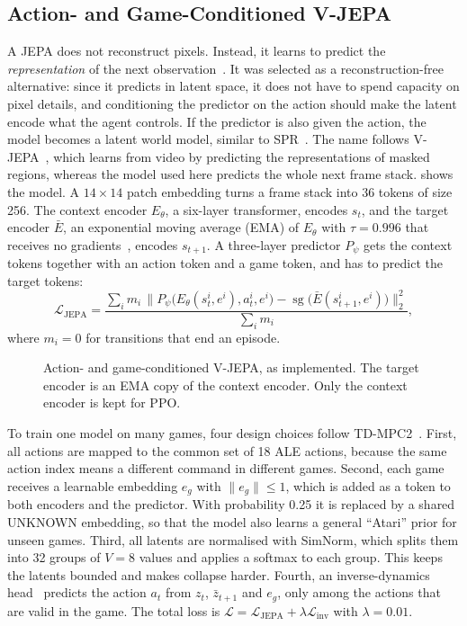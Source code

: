 \documentclass[runningheads,a4paper]{llncs}
\begin{document}
\subsection{Action- and Game-Conditioned V-JEPA}
\label{sec:jepa-model}

A JEPA does not reconstruct pixels. Instead, it learns to predict the \emph{representation}
of the next observation~\cite{lecun2022path}. It was selected as a reconstruction-free
alternative: since it predicts in latent space, it does not have to spend capacity on pixel
details, and conditioning the predictor on the action should make the latent encode what the
agent controls. If the predictor is also given the action, the
model becomes a latent world model, similar to SPR~\cite{schwarzer2021spr}. The name follows
V-JEPA~\cite{bardes2024vjepa}, which learns from video by predicting the representations of
masked regions, whereas the model used here predicts the whole next frame stack. 
shows the model. A $14\times14$ patch embedding turns a frame stack into 36 tokens of
size 256. The context encoder $E_\theta$, a six-layer transformer, encodes $s_t$, and the
target encoder $\bar E$, an exponential moving average (EMA) of $E_\theta$ with $\tau=0.996$
that receives no gradients~\cite{assran2023ijepa}, encodes $s_{t+1}$. A three-layer predictor
$P_\psi$ gets the context tokens together with an action token and a game token, and has to
predict the target tokens:
\begin{equation}
  \mathcal{L}_{\text{JEPA}}=\frac{\sum_i m_i\,\big\|P_\psi\big(E_\theta(s_t^i,e^i),a_t^i,e^i\big)
  -\operatorname{sg}\big(\bar E(s_{t+1}^i,e^i)\big)\big\|_2^2}{\sum_i m_i},
\end{equation}
where $m_i=0$ for transitions that end an episode.

\begin{figure}[tb]
\centering

\caption{Action- and game-conditioned V-JEPA, as implemented. The target
encoder is an EMA copy of the context encoder. Only the context encoder is kept for PPO.}
\label{fig:jepa}
\end{figure}

To train one model on many games, four design choices follow
TD-MPC2~\cite{hansen2024tdmpc2}. First, all actions are mapped to the common set of 18 ALE
actions, because the same action index means a different command in different games. Second, each game
receives a learnable embedding $e_g$ with $\|e_g\|\le1$, which is added as a token to both
encoders and the predictor. With probability 0.25 it is replaced by a shared UNKNOWN
embedding, so that the model also learns a general ``Atari'' prior for unseen games. Third, all
latents are normalised with SimNorm, which splits them into 32 groups of $V=8$ values and
applies a softmax to each group. This keeps the latents bounded and makes collapse harder. Fourth,
an inverse-dynamics head~\cite{pathak2017icm} predicts the action $a_t$ from $z_t$,
$\bar z_{t+1}$ and $e_g$, only among the actions that are valid in the game. The total loss is
$\mathcal{L}=\mathcal{L}_{\text{JEPA}}+\lambda\mathcal{L}_{\text{inv}}$ with $\lambda=0.01$.
\end{document}
